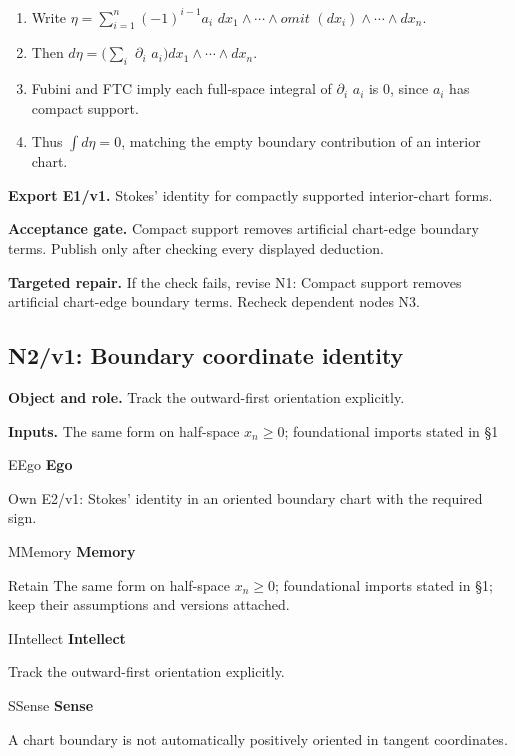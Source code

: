 \documentclass[preprint,12pt,aps,pra,showkeys,amsmath,amssymb,superscriptaddress,floatfix]{revtex4-2}
\theoremstyle{definition}
\theoremstyle{remark}
\newcommand{\mmfaculty}[3]{%
 \begin{mmfacultybox}{#1}{#2}
 {\sffamily\bfseries\color{MMBlue}#2}\par\smallskip #3
 \end{mmfacultybox}}
\newcommand{\field}[2]{\par\smallskip\noindent\textbf{#1.} #2\par}
\begin{document}
\begin{enumerate}[label=N1.\arabic*,leftmargin=3.4em]

\item Write \(\eta =\sum _{i=1}^n(-1)^{i-1}a_i\)
\(dx_{1}\wedge \cdots \wedge omit\) \((dx_i)\wedge \cdots \wedge dx_n\).

\item Then \(d\eta =(\sum _i\) \(\partial _i\)
\(a_i)dx_{1}\wedge \cdots \wedge dx_n\).

\item Fubini and FTC imply each full-space integral of \(\partial _i\) \(a_i\)
is 0, since \(a_i\) has compact support.

\item Thus \(\int d\eta =0\), matching the empty boundary contribution of an
interior chart.

\end{enumerate}

\field{Export E1/v1}{Stokes' identity for compactly supported interior-chart forms.}

\field{Acceptance gate}{Compact support removes artificial chart-edge boundary terms. Publish
only after checking every displayed deduction.}

\field{Targeted repair}{If the check fails, revise N1: Compact support removes artificial
chart-edge boundary terms. Recheck dependent nodes N3.}

\clearpage

\subsection{N2/v1: Boundary coordinate identity}

\field{Object and role}{Track the outward-first orientation explicitly.}

\field{Inputs}{The same form on half-space \(x_n\ge 0\); foundational imports stated in
§1}

\mmfaculty{E}{Ego}{Own E2/v1: Stokes' identity in an oriented boundary chart with the
required sign.}

\mmfaculty{M}{Memory}{Retain The same form on half-space \(x_n\ge 0\); foundational imports
stated in §1; keep their assumptions and versions attached.}

\mmfaculty{I}{Intellect}{Track the outward-first orientation explicitly.}

\mmfaculty{S}{Sense}{A chart boundary is not automatically positively oriented in tangent
coordinates.}
\end{document}
